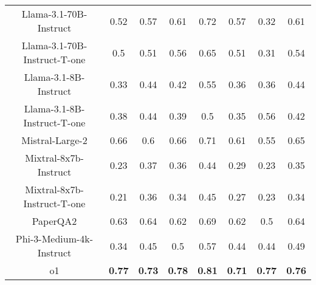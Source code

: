 \begin{tabular}{cccccccc}
Llama-3.1-70B-Instruct & 0.52 & 0.57 & 0.61 & 0.72 & 0.57 & 0.32 & 0.61 \\
Llama-3.1-70B-Instruct-T-one & 0.5 & 0.51 & 0.56 & 0.65 & 0.51 & 0.31 & 0.54 \\
Llama-3.1-8B-Instruct & 0.33 & 0.44 & 0.42 & 0.55 & 0.36 & 0.36 & 0.44 \\
Llama-3.1-8B-Instruct-T-one & 0.38 & 0.44 & 0.39 & 0.5 & 0.35 & 0.56 & 0.42 \\
Mistral-Large-2 & 0.66 & 0.6 & 0.66 & 0.71 & 0.61 & 0.55 & 0.65 \\
Mixtral-8x7b-Instruct & 0.23 & 0.37 & 0.36 & 0.44 & 0.29 & 0.23 & 0.35 \\
Mixtral-8x7b-Instruct-T-one & 0.21 & 0.36 & 0.34 & 0.45 & 0.27 & 0.23 & 0.34 \\
PaperQA2 & 0.63 & 0.64 & 0.62 & 0.69 & 0.62 & 0.5 & 0.64 \\
Phi-3-Medium-4k-Instruct & 0.34 & 0.45 & 0.5 & 0.57 & 0.44 & 0.44 & 0.49 \\
o1 & \textbf{0.77} & \textbf{0.73} & \textbf{0.78} & \textbf{0.81} & \textbf{0.71} & \textbf{0.77} & \textbf{0.76} \\
\bottomrule
\end{tabular}
